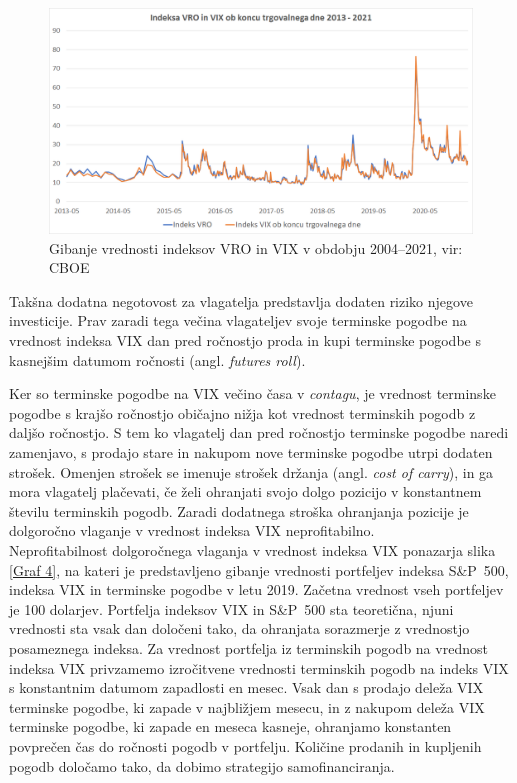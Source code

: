 \documentclass[12pt,a4paper, reqno]{amsart}
\theoremstyle{definition} %
\theoremstyle{plain} %
\begin{document}
\begin{figure}[!h]
\centering
\includegraphics[width = 15 cm]{Grafi/VRO_VIX.png}
\caption{Gibanje vrednosti indeksov VRO in VIX v obdobju 2004--2021, vir: CBOE}
\label{Graf 7}
\end{figure}

Takšna dodatna negotovost za vlagatelja predstavlja dodaten riziko njegove investicije. Prav zaradi tega večina vlagateljev svoje terminske pogodbe na vrednost indeksa VIX dan pred ročnostjo proda in kupi terminske pogodbe s kasnejšim datumom ročnosti (angl. \textit{futures roll}).\

Ker so terminske pogodbe na VIX večino časa v \textit{contagu}, je vrednost terminske pogodbe s krajšo ročnostjo običajno nižja kot vrednost terminskih pogodb z daljšo ročnostjo. S tem ko vlagatelj dan pred ročnostjo terminske pogodbe naredi zamenjavo, s prodajo stare in nakupom nove terminske pogodbe utrpi dodaten strošek. Omenjen strošek se imenuje strošek držanja (angl. \textit{cost of carry}), in ga mora vlagatelj plačevati, če želi ohranjati svojo dolgo pozicijo v konstantnem številu terminskih pogodb. Zaradi dodatnega stroška ohranjanja pozicije je dolgoročno vlaganje v vrednost indeksa VIX neprofitabilno.\\

Neprofitabilnost dolgoročnega vlaganja v vrednost indeksa VIX ponazarja slika \ref{Graf 4}, na kateri je predstavljeno gibanje vrednosti portfeljev indeksa S\&P~500,  indeksa VIX in terminske pogodbe v letu 2019. Začetna vrednost vseh portfeljev je 100 dolarjev. Portfelja indeksov VIX in S\&P~500 sta teoretična, njuni vrednosti sta vsak dan določeni tako, da ohranjata sorazmerje z vrednostjo posameznega indeksa. Za vrednost portfelja iz terminskih pogodb na vrednost indeksa VIX privzamemo izročitvene vrednosti terminskih pogodb na indeks VIX s konstantnim datumom zapadlosti en mesec. Vsak dan s prodajo deleža VIX terminske pogodbe, ki zapade v najbližjem mesecu, in z nakupom deleža VIX terminske pogodbe, ki zapade en meseca kasneje, ohranjamo konstanten povprečen čas do ročnosti pogodb v portfelju. Količine prodanih in kupljenih pogodb določamo tako, da dobimo strategijo samofinanciranja.\
\end{document}
